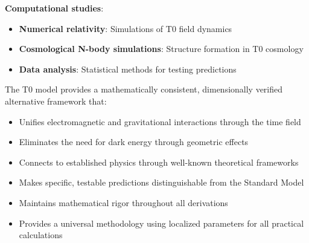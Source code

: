 \documentclass[12pt,a4paper]{article}
\begin{document}
	\textbf{Computational studies}:
	\begin{itemize}
		\item \textbf{Numerical relativity}: Simulations of T0 field dynamics
		\item \textbf{Cosmological N-body simulations}: Structure formation in T0 cosmology
		\item \textbf{Data analysis}: Statistical methods for testing predictions
	\end{itemize}
	
	\begin{tcolorbox}[colback=green!5!white,colframe=green!75!black,title=T0 Model: A Unified Framework]
		The T0 model provides a mathematically consistent, dimensionally verified alternative framework that:
		\begin{itemize}
			\item Unifies electromagnetic and gravitational interactions through the time field
			\item Eliminates the need for dark energy through geometric effects
			\item Connects to established physics through well-known theoretical frameworks
			\item Makes specific, testable predictions distinguishable from the Standard Model
			\item Maintains mathematical rigor throughout all derivations
			\item Provides a universal methodology using localized parameters for all practical calculations
		\end{itemize}
	\end{tcolorbox}
	
	
	
\end{document}
